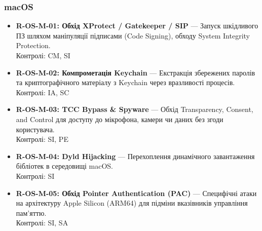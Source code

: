 \documentclass{article}
\begin{document}
\subsubsection{macOS}
\begin{itemize}
\item \textbf{R-OS-M-01: Обхід XProtect / Gatekeeper / SIP} — Запуск шкідливого ПЗ шляхом маніпуляції підписами (Code Signing), обходу System Integrity Protection.
\\ Контролі: CM, SI
\item \textbf{R-OS-M-02: Компрометація Keychain} — Екстракція збережених паролів та криптографічного матеріалу з Keychain через вразливості процесів.
\\ Контролі: IA, SC
\item \textbf{R-OS-M-03: TCC Bypass \& Spyware} — Обхід Transparency, Consent, and Control для доступу до мікрофона, камери чи даних без згоди користувача.
\\ Контролі: SI, PE
\item \textbf{R-OS-M-04: Dyld Hijacking} — Перехоплення динамічного завантаження бібліотек в середовищі macOS.
\\ Контролі: SI
\item \textbf{R-OS-M-05: Обхід Pointer Authentication (PAC)} — Специфічні атаки на архітектуру Apple Silicon (ARM64) для підміни вказівників управління пам'яттю.
\\ Контролі: SI, SA\end{itemize}
\end{document}
